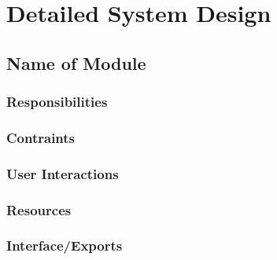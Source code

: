 \section{Detailed System Design}
\label{sec:detailed}

\subsection{Name of Module}
\label{sec:module}

\subsubsection{Responsibilities}
\label{sec:responsibilities}

\subsubsection{Contraints}
\label{sec:constraints}

\subsubsection{User Interactions}
\label{sec:interactions}

\subsubsection{Resources}
\label{sec:resources}

\subsubsection{Interface/Exports}
\label{sec:exports}


